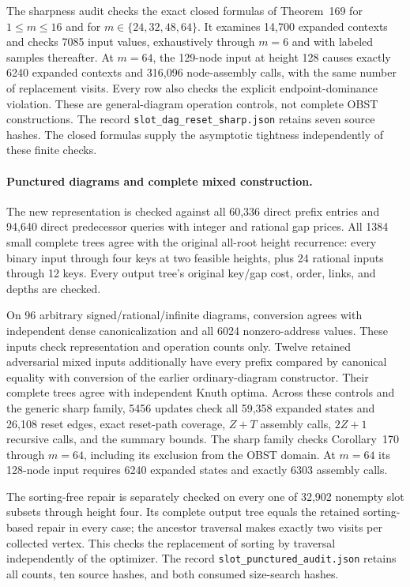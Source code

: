 \documentclass[11pt]{article}
\begin{document}
The sharpness audit checks the exact closed formulas of
Theorem~169 for $1\le m\le16$ and for
$m\in\{24,32,48,64\}$.
It examines 14,700 expanded contexts and checks 7085 input values, exhaustively
through $m=6$ and with labeled samples thereafter. At $m=64$, the 129-node
input at height 128 causes exactly 6240 expanded contexts and 316,096
node-assembly calls, with the same number of replacement visits.
Every row also checks the explicit endpoint-dominance violation. These
are general-diagram operation controls, not complete OBST constructions.
The record \texttt{slot\_dag\_reset\_sharp.json} retains seven source hashes.
The closed formulas supply the asymptotic tightness independently of these
finite checks.

\paragraph{Punctured diagrams and complete mixed construction.}
The new representation is checked against all 60,336 direct prefix entries
and 94,640 direct predecessor queries with integer and rational gap prices.
All 1384 small complete trees agree with the original all-root height
recurrence: every binary input through four keys at two feasible heights,
plus 24 rational inputs through 12 keys. Every output tree's original
key/gap cost, order, links, and depths are checked.

On 96 arbitrary signed/rational/infinite diagrams, conversion agrees with
independent dense canonicalization and all 6024 nonzero-address values.
These inputs check representation and operation counts only. Twelve
retained adversarial mixed inputs additionally have every prefix compared
by canonical equality with conversion of the earlier ordinary-diagram
constructor. Their complete trees agree with independent Knuth optima.
Across these controls and the generic sharp family, 5456 updates check all
59,358 expanded states and 26,108 reset edges, exact reset-path coverage,
$Z+T$ assembly calls, $2Z+1$ recursive calls, and the summary bounds.
The sharp family checks Corollary~170 through $m=64$,
including its exclusion from the OBST domain. At $m=64$ its 128-node input
requires 6240 expanded states and exactly 6303 assembly calls.

The sorting-free repair is separately checked on every one of 32,902
nonempty slot subsets through height four. Its complete output tree equals
the retained sorting-based repair in every case; the ancestor traversal
makes exactly two visits per collected vertex. This checks the replacement
of sorting by traversal independently of the optimizer.
The record \texttt{slot\_punctured\_audit.json} retains all counts, ten
source hashes, and both consumed size-search hashes.
\end{document}
